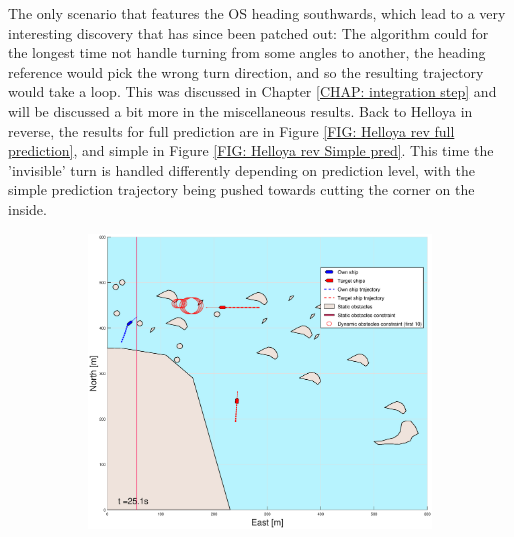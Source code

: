 The only scenario that features the OS heading southwards, which lead to a very interesting discovery that has since been patched out: The algorithm could for the longest
time not handle turning from some angles to another, the heading reference would pick the wrong turn direction, and so the resulting trajectory would take a loop. 
This was discussed in Chapter \ref{CHAP: integration step} and will be discussed a bit more in the miscellaneous results. 
Back to Helloya in reverse, the results for full prediction are in Figure \ref{FIG: Helloya rev full prediction}, 
and simple in Figure \ref{FIG: Helloya rev Simple pred}. This time the 'invisible' turn is handled differently depending on prediction level, with
the simple prediction trajectory being pushed towards cutting the corner on the inside.


\clearpage
\begin{figure}[!ht] %
    \begin{subfigure}[b]{0.494\textwidth}
        \centering
        \includegraphics[width=\textwidth]{Images/Figures/skjergard_m_trafikk_NEW/_Simple_0fig1_time=25}
        \subcaption{}
    \end{subfigure}
    \hfill
    \begin{subfigure}[b]{0.494\textwidth}
        \centering

\end{subfigure}
\end{figure}

